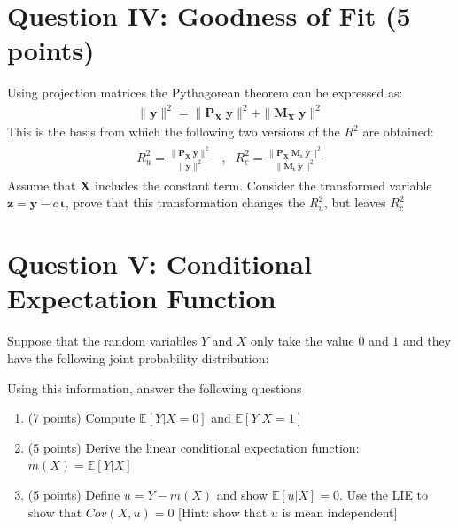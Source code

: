 \documentclass[letterpaper,12pt]{article}
\theoremstyle{dotlessS}
\begin{document}
\section*{Question IV: Goodness of Fit (5 points)}
Using projection matrices the Pythagorean theorem can be expressed as:
\begin{eqnarray*}
\|\bm{y}\|^2=\|\bm{P_X \: y}\|^2+\|\bm{M_X \: y}\|^2
\end{eqnarray*}
This is the basis from which the following two versions of the $R^2$ are obtained:
\begin{eqnarray*}
\begin{array}{lll}
R_u^2=\frac{\|\bm{P_X \: y}\|^2}{\|\bm{y}\|^2} &, & R_c^2=\frac{\|\bm{P_X \: M_{\iota} \: y}\|^2}{\|\bm{M_{\iota} \:y}\|^2}
\end{array}
\end{eqnarray*}
Assume that $\bm{X}$ includes the constant term. Consider the transformed variable $\bm{z}=\bm{y}-c \: \bm{\iota}$, prove that this transformation changes the $R_u^2$, but leaves  $R_c^2$  


\section*{Question V: Conditional Expectation Function }

Suppose that the random variables $Y$ and $X$ only take the value $0$ and $1$ and they have the following joint probability distribution: 
\begin{table}[H]
\centering
{}
\label{tab:three_by_three}
\end{table}

Using this information, answer the following questions
\begin{enumerate}[label=(\alph*)]
\item (7 points) Compute $\mathbb{E}[Y|X=0]$ and $\mathbb{E}[Y|X=1]$
\item (5 points) Derive the linear conditional expectation function: $m(X)=\mathbb{E}[Y|X]$  
\item (5 points) Define $u=Y-m(X)$ and show $\mathbb{E}[u|X]=0$. Use the LIE to show that $Cov(X,u)=0$ [Hint: show that $u$ is mean independent]
\end{enumerate}
\end{document}
